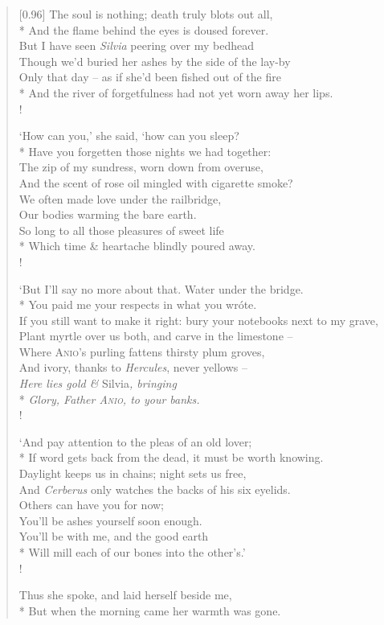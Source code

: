 \begin{verse}[0.96\textwidth]
    The soul is nothing; death truly blots out all,\\*
    \vin And the flame behind the eyes is doused forever.\\
    But I have seen \textit{Silvia} peering over my bedhead\\
    \vin Though we'd buried her ashes by the side of the lay-by\\
    Only that day -- as if she'd been fished out of the fire\\*
    \vin And the river of forgetfulness had not yet worn away her lips.\\!

    `How can you,' she said, `how can you sleep?\\*
    \vin Have you forgetten those nights we had together:\\
    The zip of my sundress, worn down from overuse,\\
    \vin And the scent of rose oil mingled with cigarette smoke?\\
    We often made love under the railbridge,\\
    \vin Our bodies warming the bare earth.\\
    So long to all those pleasures of sweet life\\*
    \vin Which time \& heartache blindly poured away.\\!

    `But I'll say no more about that. Water under the bridge.\nobreak\\*
    \vin You paid me your respects in what you wr\'ote.\\
    If you still want to make it right: bury your notebooks next to my grave,\\
    \vin Plant myrtle over us both, and carve in the limestone --\\
    Where \textsc{Anio}'s purling fattens thirsty plum groves,\\
    \vin And ivory, thanks to \textit{Hercules}, never yellows --\\
    \textit{Here lies gold \& }Silvia\textit{, bringing}\\*
    \vin \textit{Glory, Father \textsc{Anio}, to your banks.}\\!

    `And pay attention to the pleas of an old lover;\\*
    \vin If word gets back from the dead, it must be worth knowing.\\
    Daylight keeps us in chains; night sets us free,\\
    \vin And \textit{Cerberus} only watches the backs of his six eyelids.\nobreak\\
    Others can have you for now;\\
    \vin You'll be ashes yourself soon enough.\\
    You'll be with me, and the good earth\\*
    \vin Will mill each of our bones into the other's.'\\!

    Thus she spoke, and laid herself beside me,\\*
    \vin But when the morning came her warmth was gone.
\end{verse}
